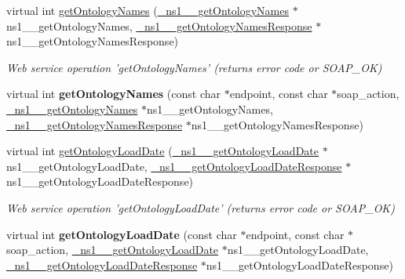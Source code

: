 \begin{DoxyCompactItemize}
\item 
\hypertarget{classOntologyQuerySoapBindingProxy_ae1b5d663d58cc473633e22ff77c214fc}{
virtual int \hyperlink{classOntologyQuerySoapBindingProxy_ae1b5d663d58cc473633e22ff77c214fc}{getOntologyNames} (\hyperlink{class__ns1____getOntologyNames}{\_\-ns1\_\-\_\-getOntologyNames} $\ast$ns1\_\-\_\-getOntologyNames, \hyperlink{class__ns1____getOntologyNamesResponse}{\_\-ns1\_\-\_\-getOntologyNamesResponse} $\ast$ns1\_\-\_\-getOntologyNamesResponse)}
\label{classOntologyQuerySoapBindingProxy_ae1b5d663d58cc473633e22ff77c214fc}

\begin{DoxyCompactList}\small\item\em Web service operation 'getOntologyNames' (returns error code or SOAP\_\-OK) \end{DoxyCompactList}\item 
\hypertarget{classOntologyQuerySoapBindingProxy_aefe3259a13dd3858b30bf79d5d877942}{
virtual int {\bfseries getOntologyNames} (const char $\ast$endpoint, const char $\ast$soap\_\-action, \hyperlink{class__ns1____getOntologyNames}{\_\-ns1\_\-\_\-getOntologyNames} $\ast$ns1\_\-\_\-getOntologyNames, \hyperlink{class__ns1____getOntologyNamesResponse}{\_\-ns1\_\-\_\-getOntologyNamesResponse} $\ast$ns1\_\-\_\-getOntologyNamesResponse)}
\label{classOntologyQuerySoapBindingProxy_aefe3259a13dd3858b30bf79d5d877942}

\item 
\hypertarget{classOntologyQuerySoapBindingProxy_a5aad685b591471e225932a842f250ca8}{
virtual int \hyperlink{classOntologyQuerySoapBindingProxy_a5aad685b591471e225932a842f250ca8}{getOntologyLoadDate} (\hyperlink{class__ns1____getOntologyLoadDate}{\_\-ns1\_\-\_\-getOntologyLoadDate} $\ast$ns1\_\-\_\-getOntologyLoadDate, \hyperlink{class__ns1____getOntologyLoadDateResponse}{\_\-ns1\_\-\_\-getOntologyLoadDateResponse} $\ast$ns1\_\-\_\-getOntologyLoadDateResponse)}
\label{classOntologyQuerySoapBindingProxy_a5aad685b591471e225932a842f250ca8}

\begin{DoxyCompactList}\small\item\em Web service operation 'getOntologyLoadDate' (returns error code or SOAP\_\-OK) \end{DoxyCompactList}\item 
\hypertarget{classOntologyQuerySoapBindingProxy_acc8493358af7a9b5c35328fd8329fd1d}{
virtual int {\bfseries getOntologyLoadDate} (const char $\ast$endpoint, const char $\ast$soap\_\-action, \hyperlink{class__ns1____getOntologyLoadDate}{\_\-ns1\_\-\_\-getOntologyLoadDate} $\ast$ns1\_\-\_\-getOntologyLoadDate, \hyperlink{class__ns1____getOntologyLoadDateResponse}{\_\-ns1\_\-\_\-getOntologyLoadDateResponse} $\ast$ns1\_\-\_\-getOntologyLoadDateResponse)}
\label{classOntologyQuerySoapBindingProxy_acc8493358af7a9b5c35328fd8329fd1d}


\end{DoxyCompactItemize}
